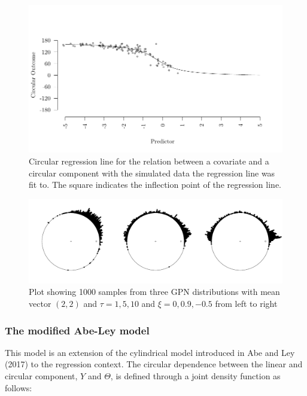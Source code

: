 \documentclass[man,mask]{apa6}
\begin{document}
\begin{figure}[]
  \includegraphics[width = \textwidth]{Plots/circregline.pdf}
  \caption{Circular regression line for the relation between a covariate and a circular component with the simulated data the regression line was fit to. The square indicates the inflection point of the regression line.}
  \label{circregline}
\end{figure}

\begin{figure}
\centering
\includegraphics[width = \textwidth]{Plots/plotGPN.pdf}
\caption{Plot showing 1000 samples from three GPN distributions with mean vector $(2,2)$ and $\tau = 1,5,10$ and $\xi = 0, 0.9, -0.5$ from left to right}
\label{plotGPN}
\end{figure}

\subsubsection{The modified Abe-Ley model}\label{WeiSSVM}

This model is an extension of the cylindrical model introduced in
Abe and Ley (2017) to the regression context. The circular dependence between the
linear and circular component, \(Y\) and \(\Theta\), is defined through a joint
density function as follows:
\end{document}
